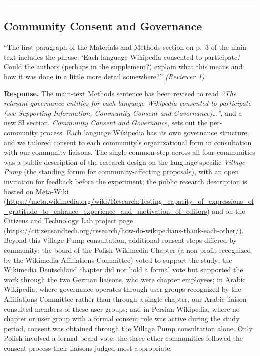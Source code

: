 \documentclass[12pt]{article}
\newenvironment{reviewquote}{%
  \def\FrameCommand{{\color{quotebarcolor}\vrule width 2pt}\colorbox{quotebg}}%
  \MakeFramed{\advance\hsize-\width \FrameRestore}%
  \small
}{%
  \endMakeFramed
}
\begin{document}
\bigskip\hrule\bigskip

\subsection{Community Consent and Governance}

\begin{reviewquote}
``The first paragraph of the Materials and Methods section on p.~3 of the main text includes the phrase: `Each language Wikipedia consented to participate.' Could the authors (perhaps in the supplement?) explain what this means and how it was done in a little more detail somewhere?'' \textit{(Reviewer 1)}
\end{reviewquote}

\textbf{Response.} The main-text Methods sentence has been revised to read \textit{``The relevant governance entities for each language Wikipedia consented to participate (see Supporting Information, Community Consent and Governance)\ldots''}, and a new SI section, \textit{Community Consent and Governance}, sets out the per-community process. Each language Wikipedia has its own governance structure, and we tailored consent to each community's organizational form in consultation with our community liaisons. The single common step across all four communities was a public description of the research design on the language-specific \emph{Village Pump} (the standing forum for community-affecting proposals), with an open invitation for feedback before the experiment; the public research description is hosted on Meta-Wiki (\url{https://meta.wikimedia.org/wiki/Research:Testing_capacity_of_expressions_of_gratitude_to_enhance_experience_and_motivation_of_editors}) and on the Citizens and Technology Lab project page (\url{https://citizensandtech.org/research/how-do-wikipedians-thank-each-other/}). Beyond this Village Pump consultation, additional consent steps differed by community: the board of the Polish Wikimedia Chapter (a non-profit recognized by the Wikimedia Affiliations Committee) voted to support the study; the Wikimedia Deutschland chapter did not hold a formal vote but supported the work through the two German liaisons, who were chapter employees; in Arabic Wikipedia, where governance operates through user groups recognized by the Affiliations Committee rather than through a single chapter, our Arabic liaison consulted members of these user groups; and in Persian Wikipedia, where no chapter or user group with a formal consent role was active during the study period, consent was obtained through the Village Pump consultation alone. Only Polish involved a formal board vote; the three other communities followed the consent process their liaisons judged most appropriate.
\end{document}
